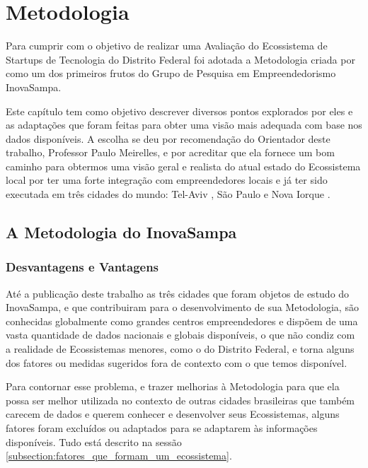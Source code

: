 \chapter[Metodologia]{Metodologia}
\label{cap-metodologia}

Para cumprir com o objetivo de realizar uma Avaliação do Ecossistema de Startups de Tecnologia do Distrito Federal foi adotada a Metodologia criada por  como um dos primeiros frutos do Grupo de Pesquisa em Empreendedorismo InovaSampa. 

Este capítulo tem como objetivo descrever diversos pontos explorados por eles e as adaptações que foram feitas para obter uma visão mais adequada com base nos dados disponíveis. A escolha se deu por recomendação do Orientador deste trabalho, Professor Paulo Meirelles, e por acreditar que ela fornece um bom caminho para obtermos uma visão geral e realista do atual estado do Ecossistema local por ter uma forte integração com empreendedores locais e já ter sido executada em três cidades do mundo: Tel-Aviv \cite{kon2014}, São Paulo \cite{monna2015} e Nova Iorque \cite{cukier2016}. 

\section{A Metodologia do InovaSampa}
\label{section:metodologia_do_inovasampa}

\subsection{Desvantagens e Vantagens}
\label{subsection:vantagens_e_desvantagens}

Até a publicação deste trabalho as três cidades que foram objetos de estudo do InovaSampa, e que contribuiram para o desenvolvimento de sua Metodologia, são conhecidas globalmente como grandes centros empreendedores e dispõem de uma vasta quantidade de dados nacionais e globais disponíveis, o que não condiz com a realidade de Ecossistemas menores, como o do Distrito Federal, e torna alguns dos fatores ou medidas sugeridos fora de contexto com o que temos disponível.

Para contornar esse problema, e trazer melhorias à Metodologia para que ela possa ser melhor utilizada no contexto de outras cidades brasileiras que também carecem de dados e querem conhecer e desenvolver seus Ecossistemas, alguns fatores foram excluídos ou adaptados para se adaptarem às informações disponíveis. Tudo está descrito na sessão \ref{subsection:fatores_que_formam_um_ecossistema}.


